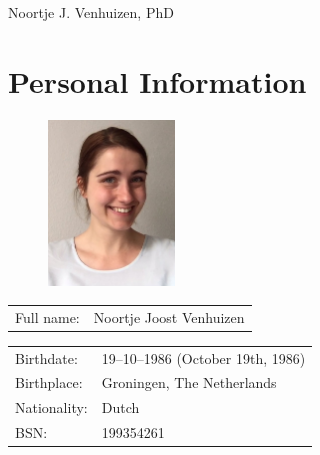 \documentclass[a4paper,10pt]{article}
\def\leftcolwidth{.12\textwidth}
\def\tablevspace{10pt}
\begin{document}

\begin{flushright}
{\Huge Noortje J. Venhuizen, PhD}
\end{flushright}


\section*{Personal Information}

\begin{figure}
  \begin{flushright}
  \includegraphics[width=0.3\textwidth]{noortje.jpg}
  \end{flushright}
\end{figure}

\noindent
\begin{tabularx}{\textwidth}{ p{\leftcolwidth} X }
  Full name:      &         Noortje Joost Venhuizen\\
\end{tabularx}

\vspace{\tablevspace}

\noindent
\begin{tabularx}{\textwidth}{ p{\leftcolwidth} X }
  Birthdate:   &         19--10--1986 (October 19th, 1986)\\
  Birthplace:  &         Groningen, The Netherlands\\
  Nationality: &         Dutch\\
  BSN:         &         199354261\\
\end{tabularx}
\end{document}
